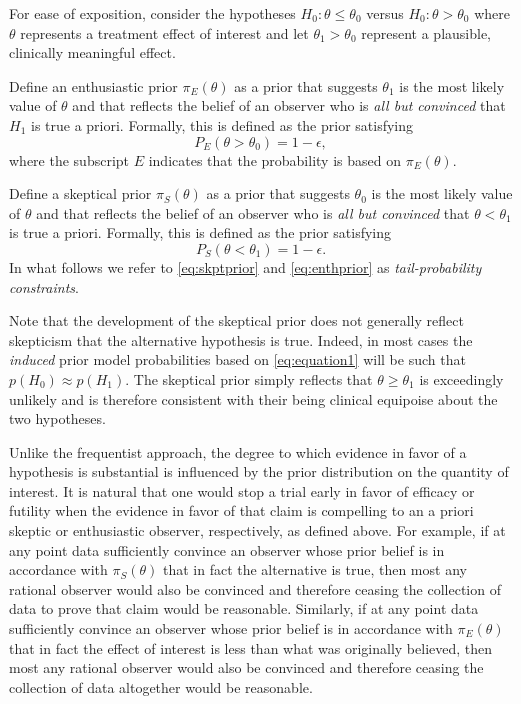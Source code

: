 \documentclass[useAMS,usenatbib,referee]{biom}
\begin{document}
For ease of exposition, consider the hypotheses $H_0: \theta \le \theta_0$ versus $H_0: \theta > \theta_0$ where $\theta$ represents a treatment effect of interest and let $\theta_1>\theta_0$ 
represent a plausible, clinically meaningful effect.

Define an enthusiastic prior $\pi_{E}(\theta)$ as a prior that suggests $\theta_1$ is the most likely value of $\theta$ 
and that reflects the belief of an observer who is \textit{all but convinced} that $H_1$ is true a priori. 
%
Formally, this is defined as the prior satisfying
\begin{equation}\label{eq:skptprior}
P_E(\theta >\theta_0)=1-\epsilon,
\end{equation}
where the subscript $E$ indicates that the probability is based on $\pi_{E}(\theta)$.

Define a skeptical prior $\pi_{S}(\theta)$ as a prior that suggests $\theta_0$ is the most likely value of $\theta$ 
and that reflects the belief of an observer who is \textit{all but convinced} that $\theta <\theta_1$ is true a priori. 
%
Formally, this is defined as the prior satisfying
\begin{equation}\label{eq:enthprior}
P_S(\theta <\theta_1)=1-\epsilon.
\end{equation}
%
In what follows we refer to \eqref{eq:skptprior} and \eqref{eq:enthprior} as \textit{tail-probability constraints}.

Note that the development of the skeptical prior does not generally reflect skepticism that the alternative hypothesis is true. 
%
Indeed, in most cases the \textit{induced} prior model probabilities based on \eqref{eq:equation1} will be such that $p(H_0) \approx p(H_1)$.
%
The skeptical prior simply reflects that $\theta \ge \theta_1$ is exceedingly unlikely and is therefore 
consistent with their being clinical equipoise about the two hypotheses.
%

Unlike the frequentist approach, the degree to which evidence in favor of a hypothesis is substantial is influenced by 
the prior distribution on the quantity of interest.
%
It is natural that one would stop a trial early in favor of efficacy or futility when the evidence in favor of that claim is compelling
to an a priori skeptic or enthusiastic observer, respectively, as defined above.
%
For example, if at any point data sufficiently convince an observer whose prior belief is in accordance with $\pi_{S}(\theta)$ that in fact
the alternative is true, then most any rational observer would also be convinced and therefore ceasing the collection of data
to prove that claim would be reasonable.
%
Similarly, if at any point data sufficiently convince an observer whose prior belief is in accordance with $\pi_{E}(\theta)$ that in fact
the effect of interest is less than what was originally believed, then most any rational observer would also be convinced and therefore ceasing 
the collection of data altogether would be reasonable.
\end{document}
